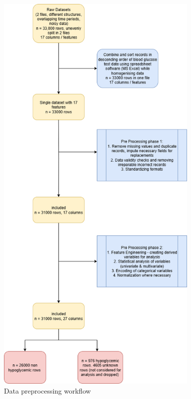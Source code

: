 	\begin{figure}[H]
		\centering
		\includegraphics[height=8in]{figures/dataPreprocessingWf.png}
		\caption{Data preprocessing workflow}
		\label{fig:datapreprocessingwf}
	\end{figure}

